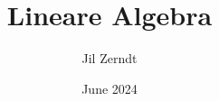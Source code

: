 \documentclass[a4paper, fontsize = 8pt, landscape]{scrartcl}
\title{Lineare Algebra}
\author{Jil Zerndt}
\date{June 2024}
\begin{document}
\begin{multicols*}{3}
    \thispagestyle{TitlePageStyle}
		\maketitle
    
    \raggedcolumns
    \newpage
    
    \raggedcolumns
    \newpage
    
    \raggedcolumns
    \newpage
    
    \raggedcolumns
    \newpage
    
    \raggedcolumns
    \newpage
    
    \raggedcolumns
    \newpage
    
    \raggedcolumns
    

\end{multicols*}
\end{document}
